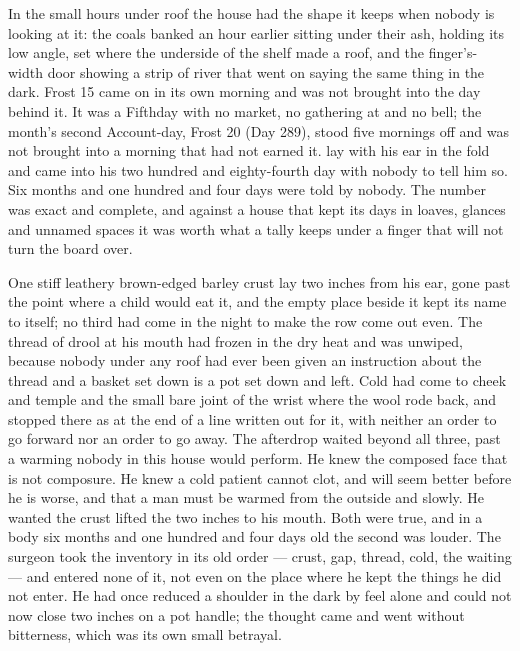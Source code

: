 
In the small hours under  roof the house had the shape it keeps when nobody is looking at it: the coals banked an hour earlier sitting under their ash,  holding its low angle,  set where the underside of the shelf made a roof, and the finger's-width door showing a strip of river that went on saying the same thing in the dark. Frost 15 came on in its own morning and was not brought into the day behind it. It was a Fifthday with no market, no gathering at  and no bell; the month's second Account-day, Frost 20 (Day 289), stood five mornings off and was not brought into a morning that had not earned it.  lay with his ear in the fold and came into his two hundred and eighty-fourth day with nobody to tell him so. Six months and one hundred and four days were told by nobody. The number was exact and complete, and against a house that kept its days in loaves, glances and unnamed spaces it was worth what a tally keeps under a finger that will not turn the board over.

One stiff leathery brown-edged barley crust lay two inches from his ear, gone past the point where a child would eat it, and the empty place beside it kept its name to itself; no third had come in the night to make the row come out even. The thread of drool at his mouth had frozen in the dry heat and was unwiped, because nobody under any roof had ever been given an instruction about the thread and a basket set down is a pot set down and left. Cold had come to cheek and temple and the small bare joint of the wrist where the wool rode back, and stopped there as at the end of a line written out for it, with neither an order to go forward nor an order to go away. The afterdrop waited beyond all three, past a warming nobody in this house would perform. He knew the composed face that is not composure. He knew a cold patient cannot clot, and will seem better before he is worse, and that a man must be warmed from the outside and slowly. He wanted the crust lifted the two inches to his mouth. Both were true, and in a body six months and one hundred and four days old the second was louder. The surgeon took the inventory in its old order --- crust, gap, thread, cold, the waiting --- and entered none of it, not even on the place where he kept the things he did not enter. He had once reduced a shoulder in the dark by feel alone and could not now close two inches on a pot handle; the thought came and went without bitterness, which was its own small betrayal.

